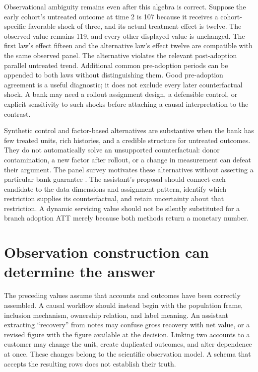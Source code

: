 Observational ambiguity remains even after this algebra is correct. Suppose
the early cohort's untreated outcome at time 2 is 107 because it receives a
cohort-specific favorable shock of three, and its actual treatment effect
is twelve. The observed value remains 119, and every other displayed value is
unchanged. The first law's effect fifteen and the alternative law's effect
twelve are compatible with the same observed panel. The alternative violates
the relevant post-adoption parallel untreated trend. Additional common
pre-adoption periods can be appended to both laws without distinguishing
them. Good pre-adoption agreement is a useful diagnostic; it does not exclude
every later counterfactual shock. A bank may need a rollout assignment design,
a defensible control, or explicit sensitivity to such shocks before attaching
a causal interpretation to the contrast.

Synthetic control and factor-based alternatives are substantive when the
bank has few treated units, rich histories, and a credible structure for
untreated outcomes. They do not automatically solve an unsupported
counterfactual: donor contamination, a new factor after rollout, or a change
in measurement can defeat their argument. The panel survey motivates these
alternatives without asserting a particular bank guarantee
\citep{panelreview2024}. The assistant's proposal should connect each candidate
to the data dimensions and assignment pattern, identify which restriction
supplies its counterfactual, and retain uncertainty about that restriction.
A dynamic servicing value should not be silently substituted for a branch
adoption ATT merely because both methods return a monetary number.

\section{Observation construction can determine the answer}
\label{exec14:l5-observations}

The preceding values assume that accounts and outcomes have been correctly
assembled. A causal workflow should instead begin with the population frame,
inclusion mechanism, ownership relation, and label meaning. An assistant
extracting ``recovery'' from notes may confuse gross recovery with net value,
or a revised figure with the figure available at the decision. Linking two
accounts to a customer may change the unit, create duplicated outcomes, and
alter dependence at once. These changes belong to the scientific observation
model. A schema that accepts the resulting rows does not establish their truth.

